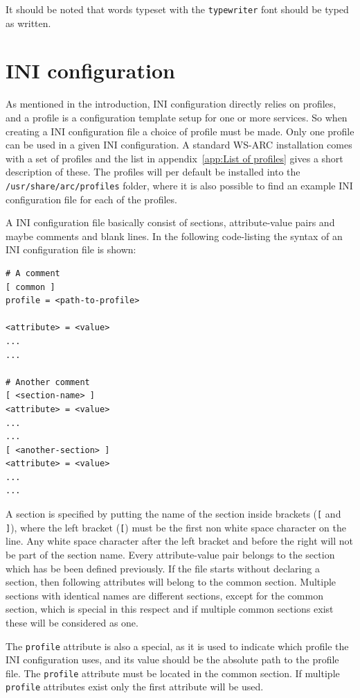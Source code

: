 \documentclass{article}
\begin{document}
It should be noted that words typeset with the \texttt{typewriter} font should
be typed as written.


\section{INI configuration}\label{sec:INI configuration}
As mentioned in the introduction, INI configuration directly relies on profiles,
and a profile is a configuration template setup for one or more services. So
when creating a INI configuration file a choice of profile must be made. Only
one profile can be used in a given INI configuration. A standard WS-ARC
installation comes with a set of profiles and the list in
appendix~\ref{app:List of profiles} gives a short description of these. The
profiles will per default be installed into the \texttt{/usr/share/arc/profiles}
folder, where it is also possible to find an example INI configuration file for
each of the profiles.

A INI configuration file basically consist of sections, attribute-value pairs
and maybe comments and blank lines. In the following code-listing the syntax of
an INI configuration file is shown:
\begin{lstlisting}
# A comment
[ common ]
profile = <path-to-profile>

<attribute> = <value>
...
...

# Another comment
[ <section-name> ]
<attribute> = <value>
...
...
[ <another-section> ]
<attribute> = <value>
...
...
\end{lstlisting}

A section is specified by putting the name of the section inside brackets
(\texttt{[} and \texttt{]}), where the left bracket (\texttt{[}) must be the
first non white space character on the line. Any white space character after the
left bracket and before the right will not be part of the section name. Every
attribute-value pair belongs to the section which has be been defined
previously. If the file starts without declaring a section, then following
attributes will belong to the common section. Multiple sections with identical
names are different sections, except for the common section, which is special in
this respect and if multiple common sections exist these will be considered as
one.

The \texttt{profile} attribute is also a special, as it is used to indicate
which profile the INI configuration uses, and its value should be the
absolute path to the profile file. The \texttt{profile} attribute must be
located in the common section. If multiple \texttt{profile} attributes exist
only the first attribute will be used.
\end{document}
